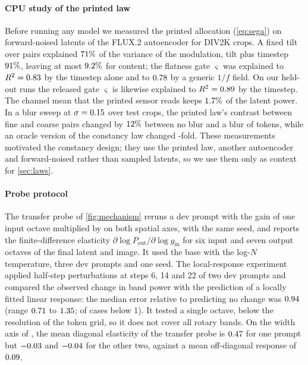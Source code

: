 \paragraph{CPU study of the printed \sega{} law}
Before running any model we measured the printed allocation (\cref{eq:sega}) on forward-noised latents of the FLUX.2 autoencoder for \NmechCpuN{} DIV2K crops. A fixed tilt over pairs explained $71\%$ of the variance of the modulation, tilt plus timestep $91\%$, leaving at most $9.2\%$ for content; the flatness gate $\varsigma$ was explained to $R^2=0.83$ by the timestep alone and to $0.78$ by a generic $1/f$ field. On our held-out \krea{} runs the released gate $\varsigma$ is likewise explained to $R^2=0.89$ by the timestep. The channel mean that the printed sensor reads keeps $1.7\%$ of the latent power. In a blur sweep at $\sigma=0.15$ over \NmechBlurN{} test crops, the printed law's contrast between fine and coarse pairs changed by $12\%$ between no blur and a blur of \NmechBlurMax{} tokens, while an oracle version of the constancy law changed \NmechBlurConstFold-fold. These measurements motivated the constancy design; they use the printed law, another autoencoder and forward-noised rather than sampled latents, so we use them only as context for \cref{sec:laws}.

\paragraph{Probe protocol}
The transfer probe of \cref{fig:mechanism} reruns a dev prompt with the gain of one input octave multiplied by \NmechProbeFactor{} on both spatial axes, with the same seed, and reports the finite-difference elasticity $\partial\log P_{\mathrm{out}}/\partial\log g_{\mathrm{in}}$ for six input and seven output octaves of the final latent and image. It used the \ntk{} base with the log-$N$ temperature, three dev prompts and one seed. The local-response experiment applied half-step perturbations at steps 6, 14 and 22 of two dev prompts and compared the observed change in band power with the prediction of a locally fitted linear response: the median error relative to predicting no change was $0.94$ (range $0.71$ to $1.35$; \NmechCrSeventeenBelowOne{} of \NmechCrSeventeenAxisRows{} cases below 1). It tested a single octave, below the resolution of the token grid, so it does not cover all rotary bands. On the width axis of \krea, the mean diagonal elasticity of the transfer probe is $0.47$ for one prompt but $-0.03$ and $-0.04$ for the other two, against a mean off-diagonal response of $0.09$.

